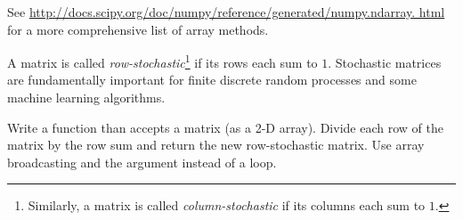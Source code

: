 See \url{http://docs.scipy.org/doc/numpy/reference/generated/numpy.ndarray.
html} for a more comprehensive list of array methods.

\begin{problem} %
A matrix is called \emph{row-stochastic}\footnote{Similarly, a matrix is called \emph{column-stochastic} if its columns each sum to $1$.} if its rows each sum to $1$.
Stochastic matrices are fundamentally important for finite discrete random processes and some machine learning algorithms.

Write a function than accepts a matrix (as a 2-D array).
Divide each row of the matrix by the row sum and return the new row-stochastic matrix.
Use array broadcasting and the  argument instead of a loop.
\end{problem}

